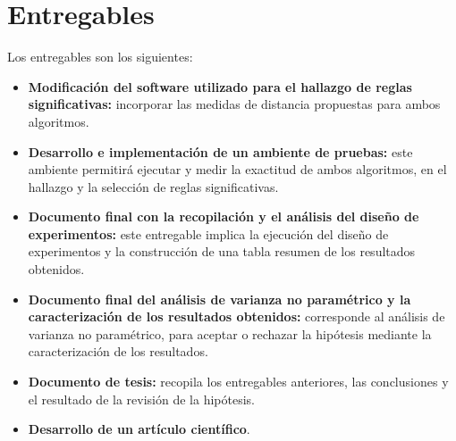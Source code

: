 \section{\textbf{Entregables}}
Los entregables son los siguientes:
\begin{itemize}
\item \textbf{Modificaci\'on del software utilizado para el hallazgo de reglas significativas:} incorporar las medidas de distancia propuestas para ambos algoritmos.
\item \textbf{Desarrollo e implementaci\'on de un ambiente de pruebas:} este ambiente permitir\'a ejecutar y medir la exactitud de ambos algoritmos, en el hallazgo y la selecci\'on de reglas significativas.
\item \textbf{Documento final con la recopilaci\'on y el an\'alisis del dise\~no de experi\-mentos:} este entregable implica la ejecuci\'on del dise\~no de experimentos y la construcci\'on de una tabla resumen de los resultados obtenidos. 
\item \textbf{Documento final del an\'alisis de varianza no param\'etrico y la caracterizaci\'on de los resultados obtenidos:} corresponde al an\'alisis de varianza no param\'etrico, para aceptar o rechazar la hip\'otesis mediante la caracterizaci\'on de los resultados.
\item \textbf{Documento de tesis:} recopila los entregables anteriores, las conclusiones y el resultado de la revisi\'on de la hip\'otesis.
\item \textbf{Desarrollo de un art\'iculo cient\'ifico}.
\end{itemize}
